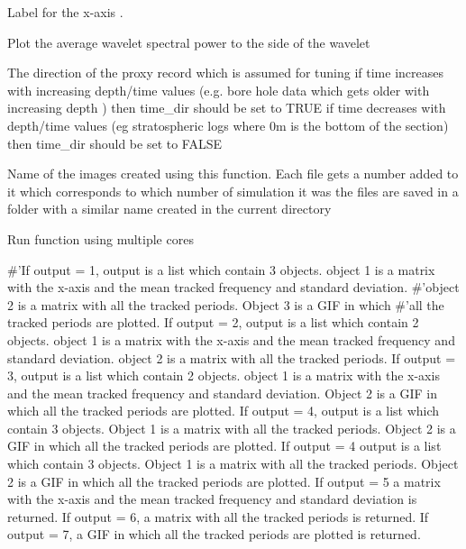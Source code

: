 \documentclass[a4paper]{book}
\begin{document}
\begin{Arguments}
\begin{ldescription}
\item[\code{x\_lab}] Label for the x-axis .

\item[\code{add\_avg}] Plot the average wavelet spectral power to the side of the wavelet 

\item[\code{time\_dir}] The direction of the proxy record which is assumed for tuning if time increases with increasing depth/time values
(e.g. bore hole data which gets older with increasing depth ) then time\_dir should be set to TRUE
if time decreases with depth/time values (eg stratospheric logs where 0m is the bottom of the section)
then time\_dir should be set to FALSE 

\item[\code{file\_name}] Name of the images created using this function. Each file
gets a number added to it which corresponds to which number of simulation it was
the files are saved in a folder with a similar name created in the current
directory

\item[\code{run\_multicore}] Run function using multiple cores 

\item[\code{output}] \#'If output = 1, output is a list which contain 3 objects.
object 1 is a matrix with the x-axis and the mean tracked frequency and
standard deviation. \#'object 2 is a matrix with all the tracked periods.
Object 3 is a GIF in which \#'all the tracked periods are plotted.
If output = 2, output is a list which contain 2 objects. object 1 is a matrix
with the x-axis and the mean tracked frequency and standard deviation.
object 2 is a matrix with all the tracked periods.
If output = 3, output is a list which contain 2 objects. object 1 is a matrix
with the x-axis and the mean tracked frequency and standard deviation.
Object 2 is a GIF in which
all the tracked periods are plotted.
If output = 4, output is a list which contain 3 objects. Object 1 is a matrix
with all the tracked periods. Object 2 is a GIF in which  all the tracked
periods are plotted.
If output = 4 output is a list which contain 3 objects. Object 1 is a matrix
with all the tracked periods. Object 2 is a GIF in which  all the tracked
periods are plotted.
If output = 5 a matrix with the x-axis and the mean tracked frequency and
standard deviation is returned.
If output = 6, a matrix with all the tracked periods is returned.
If output = 7, a GIF in which all the tracked periods are plotted is returned.


\end{ldescription}
\end{Arguments}
\end{document}
